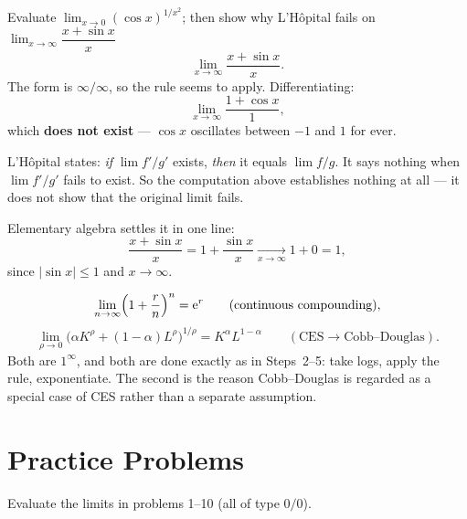 \begin{worked}{Evaluate $\lim_{x\to0}(\cos x)^{1/x^{2}}$; then show why L'H\^opital fails on $\lim_{x\to\infty}\dfrac{x+\sin x}{x}$}
\[
  \lim_{x\to\infty}\frac{x+\sin x}{x} .
\]
The form is $\infty/\infty$, so the rule seems to apply. Differentiating:
\[
  \lim_{x\to\infty}\frac{1+\cos x}{1} ,
\]
which \textbf{does not exist} --- $\cos x$ oscillates between $-1$ and $1$
for ever.

L'H\^opital states: \emph{if} $\lim f'/g'$ exists, \emph{then} it equals
$\lim f/g$. It says nothing when $\lim f'/g'$ fails to exist. So the
computation above establishes nothing at all --- it does not show that the
original limit fails.

Elementary algebra settles it in one line:
\[
  \frac{x+\sin x}{x}=1+\frac{\sin x}{x}
  \xrightarrow[x\to\infty]{}1+0=1 ,
\]
since $|\sin x|\le1$ and $x\to\infty$.

\[
  \lim_{n\to\infty}\Bigl(1+\frac{r}{n}\Bigr)^{n}=\mathrm{e}^{r}
  \qquad(\text{continuous compounding}),
\]
\[
  \lim_{\rho\to0}\bigl(\alpha K^{\rho}+(1-\alpha)L^{\rho}\bigr)^{1/\rho}
  =K^{\alpha}L^{1-\alpha}
  \qquad(\text{CES}\to\text{Cobb--Douglas}).
\]
Both are $1^{\infty}$, and both are done exactly as in Steps~2--5: take
logs, apply the rule, exponentiate. The second is the reason Cobb--Douglas
is regarded as a special case of CES rather than a separate assumption.
\end{worked}

\section{Practice Problems}

Evaluate the limits in problems 1--10 (all of type $0/0$).

